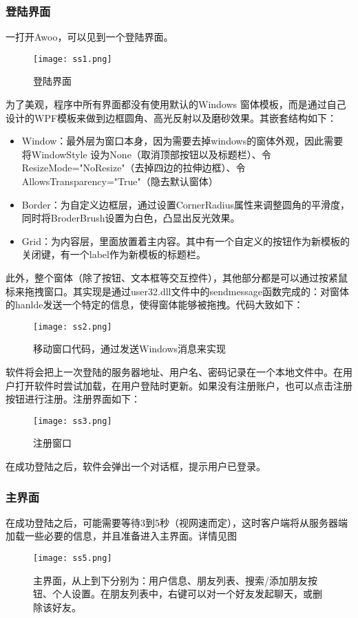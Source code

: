\documentclass[a4paper,11pt]{article}
\begin{document}
        \subsubsection{登陆界面}
            一打开Awoo，可以见到一个登陆界面。\par
            \begin{figure}[H]
                \centering
                \texttt{[image: ss1.png]}
                \caption{登陆界面}
            \end{figure}
            为了美观，程序中所有界面都没有使用默认的Windows 窗体模板，而是通过自己设计的WPF模板来做到边框圆角、高光反射以及磨砂效果。其嵌套结构如下：\par
            \begin{itemize}
                \item Window：最外层为窗口本身，因为需要去掉windows的窗体外观，因此需要将WindowStyle 设为None（取消顶部按钮以及标题栏）、令ResizeMode="NoResize"（去掉四边的拉伸边框）、令
                    AllowsTransparency="True"（隐去默认窗体）
                \item Border：为自定义边框层，通过设置CornerRadius属性来调整圆角的平滑度，同时将BroderBrush设置为白色，凸显出反光效果。
                \item Grid：为内容层，里面放置着主内容。其中有一个自定义的按钮作为新模板的关闭键，有一个label作为新模板的标题栏。
            \end{itemize}
            此外，整个窗体（除了按钮、文本框等交互控件），其他部分都是可以通过按紧鼠标来拖拽窗口。其实现是通过user32.dll文件中的sendmessage函数完成的：对窗体的hanlde发送一个特定的信息，使得窗体能够被拖拽。代码大致如下：\par
            \begin{figure}[H]
                \centering
                \texttt{[image: ss2.png]}
                \caption{移动窗口代码，通过发送Windows消息来实现}
            \end{figure}
            软件将会把上一次登陆的服务器地址、用户名、密码记录在一个本地文件中。在用户打开软件时尝试加载，在用户登陆时更新。如果没有注册账户，也可以点击注册按钮进行注册。注册界面如下：\par
            \begin{figure}[H]
                \centering
                \texttt{[image: ss3.png]}
                \caption{注册窗口}
            \end{figure}
            在成功登陆之后，软件会弹出一个对话框，提示用户已登录。
        \subsubsection{主界面}
            在成功登陆之后，可能需要等待3到5秒（视网速而定），这时客户端将从服务器端加载一些必要的信息，并且准备进入主界面。详情见图\par
            \begin{figure}[H]
                \centering
                \texttt{[image: ss5.png]}
                \caption{主界面，从上到下分别为：用户信息、朋友列表、搜索/添加朋友按钮、个人设置。在朋友列表中，右键可以对一个好友发起聊天，或删除该好友。}
            \end{figure}
\end{document}
